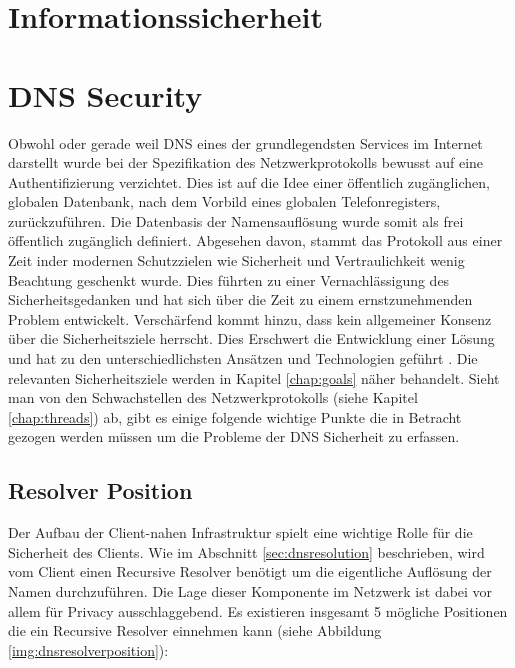\section{Informationssicherheit}

\section{DNS Security}
\label{sec:dnssecurity}

Obwohl oder gerade weil DNS eines der grundlegendsten Services im Internet darstellt wurde bei der Spezifikation des Netzwerkprotokolls bewusst auf eine Authentifizierung verzichtet. Dies ist auf die Idee einer öffentlich zugänglichen, globalen Datenbank, nach dem Vorbild eines globalen Telefonregisters, zurückzuführen. Die Datenbasis der Namensauflösung wurde somit als frei öffentlich zugänglich definiert. Abgesehen davon, stammt das Protokoll aus einer Zeit inder modernen Schutzzielen wie Sicherheit und Vertraulichkeit wenig Beachtung geschenkt wurde. Dies führten zu einer Vernachlässigung des Sicherheitsgedanken und hat sich über die Zeit zu einem ernstzunehmenden Problem entwickelt. Verschärfend kommt hinzu, dass kein allgemeiner Konsenz über die Sicherheitsziele herrscht. Dies Erschwert die Entwicklung einer Lösung und hat zu den unterschiedlichsten Ansätzen und Technologien geführt \cite{Grothoff2018}. Die relevanten Sicherheitsziele werden in Kapitel \ref{chap:goals} näher behandelt. Sieht man von den Schwachstellen des Netzwerkprotokolls (siehe Kapitel \ref{chap:threads}) ab, gibt es einige folgende wichtige Punkte die in Betracht gezogen werden müssen um die Probleme der DNS Sicherheit zu erfassen.

\subsection{Resolver Position}
Der Aufbau der Client-nahen Infrastruktur spielt eine wichtige Rolle für die Sicherheit des Clients. Wie im Abschnitt \ref{sec:dnsresolution} beschrieben, wird vom Client einen Recursive Resolver benötigt um die eigentliche Auflösung der Namen durchzuführen. Die Lage dieser Komponente im Netzwerk ist dabei vor allem für Privacy ausschlaggebend. Es existieren insgesamt 5 mögliche Positionen die ein Recursive Resolver einnehmen kann\cite{VanHeugten2018} (siehe Abbildung \ref{img:dnsresolverposition}):

